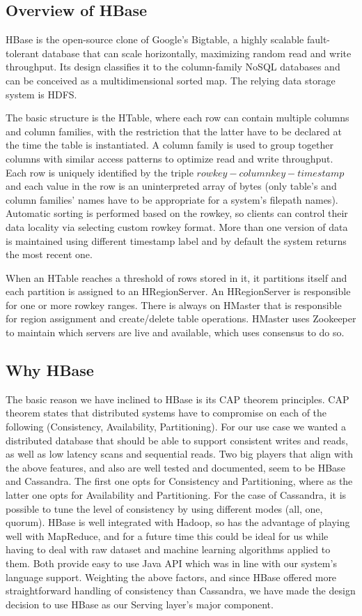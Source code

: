 \documentclass{lmproj}
\begin{document}
\subsection{Overview of HBase}
HBase is the open-source clone of Google's Bigtable, a highly scalable fault-tolerant database that can scale horizontally, maximizing random read and write throughput. Its design classifies it to the column-family NoSQL databases and can be conceived as a multidimensional sorted map. The relying data storage system is HDFS.

The basic structure is the HTable, where each row can contain multiple columns and column families, with the restriction that the latter have to be declared at the time the table is instantiated. A column family is used to group together columns with similar access patterns to optimize read and write throughput. Each row is uniquely identified by the triple $row key-column key-timestamp$ and each value in the row is an uninterpreted array of bytes (only table's and column families' names have to be appropriate for a system's filepath names). Automatic sorting is performed based on the rowkey, so clients can control their data locality via selecting custom rowkey format. More than one version of data is maintained using different timestamp label and by default the system returns the most recent one.

When an HTable reaches a threshold of rows stored in it, it partitions itself and each partition is assigned to an HRegionServer. An HRegionServer is responsible for one or more rowkey ranges. There is always on HMaster that is responsible for region assignment and create/delete table operations. HMaster uses Zookeeper to maintain which servers are live and available, which uses consensus to do so.

\subsection{Why HBase}

The basic reason we have inclined to HBase is its CAP theorem principles. CAP theorem states that distributed systems have to compromise on each of the following (Consistency, Availability, Partitioning). For our use case we wanted a distributed database that should be able to support consistent writes and reads, as well as low latency scans and sequential reads. Two big players that align with the above features, and also are well tested and documented, seem to be HBase and Cassandra. The first one opts for Consistency and Partitioning, where as the latter one opts for Availability and Partitioning. For the case of Cassandra, it is possible to tune the level of consistency by using different modes (all, one, quorum). HBase is well integrated with Hadoop, so has the advantage of playing well with MapReduce, and for a future time this could be ideal for us while having to deal with raw dataset and machine learning algorithms applied to them. Both provide easy to use Java API which was in line with our system's language support. Weighting the above factors, and since HBase offered more straightforward handling of consistency than Cassandra, we have made the design decision to use HBase as our Serving layer's major component. 
\end{document}
